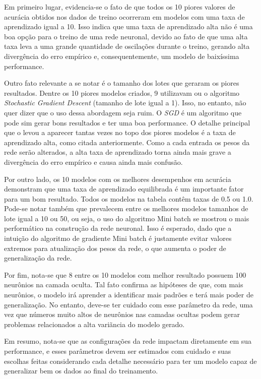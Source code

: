 \documentclass{article}
\begin{document}
Em primeiro lugar, evidencia-se o fato de que todos os 10 piores valores de acurácia obtidos nos dados de treino ocorreram em modelos com uma taxa de aprendizado igual a 10. Isso indica que uma taxa de aprendizado alta não é uma boa opção para o treino de uma rede neuronal, devido ao fato de que uma alta taxa leva a uma grande quantidade de oscilações durante o treino, gerando alta divergência do erro empírico e, consequentemente, um modelo de baixíssima performance.

Outro fato relevante a se notar é o tamanho dos lotes que geraram os piores resultados. Dentre os 10 piores modelos criados, 9 utilizavam ou o algoritmo \textit{Stochastic Gradient Descent} (tamanho de lote igual a 1). Isso, no entanto, não quer dizer que o uso dessa abordagem seja ruim. O \textit{SGD} é um algoritmo que pode sim gerar bons resultados e ter uma boa performance. O detalhe principal que o levou a aparecer tantas vezes no topo dos piores modelos é a taxa de aprendizado alta, como citada anteriormente. Como a cada entrada os pesos da rede serão alterados, a alta taxa de aprendizado torna ainda mais grave a divergência do erro empírico e causa ainda mais confusão.

Por outro lado, os 10 modelos com os melhores desempenhos em acurácia demonstram que uma taxa de aprendizado equilibrada é um importante fator para um bom resultado. Todos os modelos na tabela contêm taxas de 0.5 ou 1.0. Pode-se notar também que prevalecem entre os melhores modelos tamanhos de lote igual a 10 ou 50, ou seja, o uso do algoritmo Mini batch se mostrou o mais performático na construção da rede neuronal. Isso é esperado, dado que a intuição do algoritmo de gradiente Mini batch é justamente evitar valores extremos para atualização dos pesos da rede, o que aumenta o poder de generalização da rede.

Por fim, nota-se que 8 entre os 10 modelos com melhor resultado possuem 100 neurônios na camada oculta. Tal fato confirma as hipóteses de que, com mais neurônios, o modelo irá aprender a identificar mais padrões e terá mais poder de generalização. No entanto, deve-se ter cuidado com esse parâmetro da rede, uma vez que números muito altos de neurônios nas camadas ocultas podem gerar problemas relacionados a alta variãncia do modelo gerado.

Em resumo, nota-se que as configurações da rede impactam diretamente em sua performance, e esses parâmetros devem ser estimados com cuidado e suas escolhas feitas considerando cada detalhe necessário para ter um modelo capaz de generalizar bem os dados ao final do treinamento.
\end{document}
